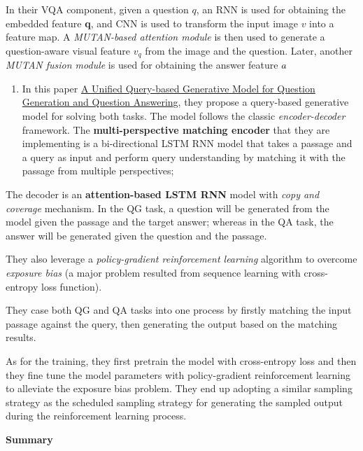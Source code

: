 \documentclass{acm_proc_article-sp}
\renewcommand{\paragraph}[1]{\vskip 6pt\noindent\textbf{#1 }}
\providecommand{\tightlist}{%
  \setlength{\itemsep}{0pt}\setlength{\parskip}{0pt}}
\begin{document}
In their VQA component, given a question \(q\), an RNN is used for
obtaining the embedded feature \textbf{q}, and CNN is used to transform
the input image \(v\) into a feature map. A \emph{MUTAN-based attention
module} is then used to generate a question-aware visual feature \(v_q\)
from the image and the question. Later, another \emph{MUTAN fusion
module} is used for obtaining the answer feature \(a\hat{}\)

\begin{enumerate}
\def\labelenumi{\arabic{enumi}.}
\setcounter{enumi}{3}
\tightlist
\item
  In this paper \href{https://arxiv.org/pdf/1709.01058.pdf}{A Unified
  Query-based Generative Model for Question Generation and Question
  Answering}, they propose a query-based generative model for solving
  both tasks. The model follows the classic \emph{encoder-decoder}
  framework. The \textbf{multi-perspective matching encoder} that they
  are implementing is a bi-directional LSTM RNN model that takes a
  passage and a query as input and perform query understanding by
  matching it with the passage from multiple perspectives;
\end{enumerate}

The decoder is an \textbf{attention-based LSTM RNN} model with
\emph{copy and coverage} mechanism. In the QG task, a question will be
generated from the model given the passage and the target answer;
whereas in the QA task, the answer will be generated given the question
and the passage.

They also leverage a \emph{policy-gradient reinforcement learning}
algorithm to overcome \emph{exposure bias} (a major problem resulted
from sequence learning with cross-entropy loss function).

They case both QG and QA tasks into one process by firstly matching the
input passage against the query, then generating the output based on the
matching results.

As for the training, they first pretrain the model with cross-entropy
loss and then they fine tune the model parameters with policy-gradient
reinforcement learning to alleviate the exposure bias problem. They end
up adopting a similar sampling strategy as the scheduled sampling
strategy for generating the sampled output during the reinforcement
learning process.

\paragraph{Summary}\label{summary-2}
\end{document}
